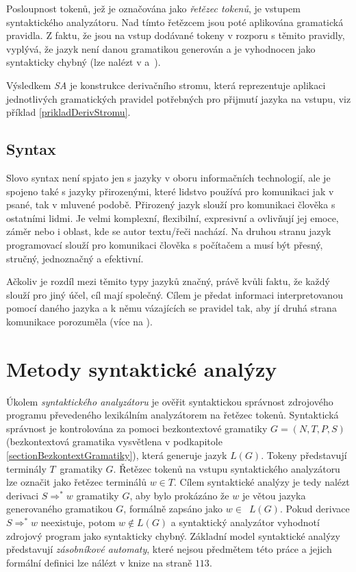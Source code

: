 Posloupnost tokenů, jež je označována jako \emph{řetězec tokenů}, je vstupem syntaktického analyzátoru.
Nad tímto řetězcem jsou poté aplikována gramatická pravidla.
Z faktu, že jsou na vstup dodávané tokeny v rozporu s těmito pravidly, vyplývá, že jazyk není danou gramatikou generován a je vyhodnocen jako
syntakticky chybný (lze nalézt v \cite{Meduna:2008:ElementsOfCompilerDesign} a~\cite{Alfred:2007:Compilers}).

Výsledkem \emph{SA} je konstrukce derivačního stromu, která reprezentuje aplikaci jednotlivých gramatických pravidel potřebných pro přijmutí
jazyka na vstupu, viz příklad \ref{prikladDerivStromu}.



\subsection*{Syntax}
Slovo syntax není spjato jen s jazyky v oboru informačních technologií, ale je spojeno také s jazyky přirozenými, které lidstvo používá
pro komunikaci jak v psané, tak v mluvené podobě.
Přirozený jazyk slouží pro komunikaci člověka s ostatními lidmi. Je
velmi komplexní, flexibilní, expresivní a ovlivňují jej emoce, záměr nebo i oblast, kde se autor textu/řeči nachází.
Na druhou stranu jazyk programovací slouží pro komunikaci člověka s počítačem a musí být přesný,
stručný, jednoznačný a efektivní.

Ačkoliv je rozdíl mezi těmito typy jazyků
značný, právě kvůli faktu, že každý slouží pro jiný účel, cíl mají společný. Cílem je předat informaci interpretovanou pomocí daného jazyka a k němu vázajících se
pravidel tak, aby jí druhá strana
komunikace porozuměla (více na \cite{nextbridge:2023:LanguagesDifference}).

\section{Metody syntaktické analýzy}
Úkolem \emph{syntaktického analyzátoru} je ověřit syntaktickou správnost zdrojového programu převedeného lexikálním analyzátorem na řetězec tokenů.
Syntaktická správnost je kon\-tro\-lo\-vá\-na za pomoci bezkontextové gramatiky $G = (N, T, P, S)$ (bezkontextová gramatika vysvětlena v podkapitole \ref{sectionBezkontextGramatiky}), která
generuje jazyk $L(G)$. Tokeny představují terminály $T$~gramatiky $G$. Řetězec tokenů na vstupu syntaktického analyzátoru lze označit jako řetězec terminálů
$w \in T$.
Cílem syntaktické analýzy je tedy nalézt derivaci $S \Rightarrow^* w$ gramatiky $G$, aby bylo prokázáno že $w$ je větou jazyka generovaného gramatikou $G$,
formálně zapsáno jako $w \in$~$L(G)$. Pokud derivace $S \Rightarrow^* w$ neexistuje, potom $w \notin L(G)$ a syntaktický analyzátor vyhodnotí zdrojový program jako
syntakticky chybný.  Základní model syntaktické analýzy představují \emph{zásobníkové automaty}, které nejsou předmětem této práce a jejich formální definici lze nálézt v knize
\cite{Meduna:2014:FormalLanguagesAndComputation} na straně $113$.

